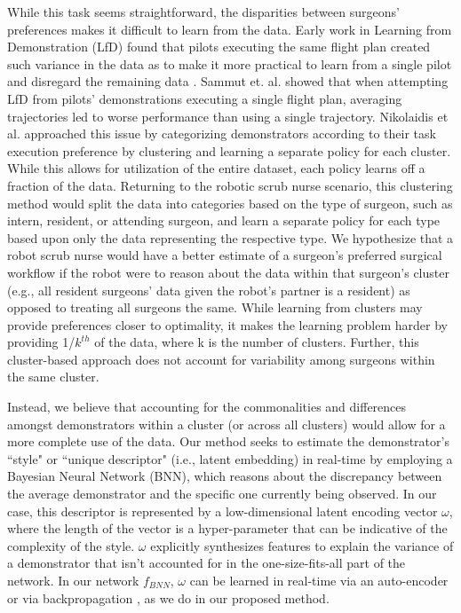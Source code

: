 \documentclass[conference]{IEEEtran}
\begin{document}
\par While this task seems straightforward, the disparities between surgeons' preferences makes it difficult to learn from the data. Early work in Learning from Demonstration (LfD) found that pilots executing the same flight plan created such variance in the data as to make it more practical to learn from a single pilot and disregard the remaining data \cite{DBLP:conf/icml/MoralesS04}. Sammut et. al. \cite{DBLP:conf/icml/SammutHKM92} showed that when attempting LfD from pilots' demonstrations executing a single flight plan, averaging trajectories led to worse performance than using a single trajectory. Nikolaidis et al. \cite{Nikolaidis:2015:EML:2696454.2696455} approached this issue by categorizing demonstrators according to their task execution preference by clustering and learning a separate policy for each cluster. While this allows for utilization of the entire dataset, each policy learns off a fraction of the data. Returning to the robotic scrub nurse scenario, this clustering method would split the data into categories based on the type of surgeon, such as intern, resident, or attending surgeon, and learn a separate policy for each type based upon only the data representing the respective type. We hypothesize that a robot scrub nurse would have a better estimate of a surgeon's preferred surgical workflow if the robot were to reason about the data within that surgeon's cluster (e.g., all resident surgeons' data given the robot's partner is a resident) as opposed to treating all surgeons the same.  While learning from clusters may provide preferences closer to optimality, it makes the learning problem harder by providing 1/$k^{th}$ of the data, where k is the number of clusters. Further, this cluster-based approach does not account for variability among surgeons within the same cluster. 

\par Instead, we believe that accounting for the commonalities and differences amongst demonstrators within a cluster (or across all clusters) would allow for a more complete use of the data. Our method seeks to estimate the demonstrator's ``style" or ``unique descriptor" (i.e., latent embedding) in real-time by employing a Bayesian Neural Network (BNN), which reasons about the discrepancy between the average demonstrator and the specific one currently being observed. In our case, this descriptor is represented by a low-dimensional latent encoding vector $\omega$, where the length of the vector is a hyper-parameter that can be indicative of the complexity of the style. $\omega$ explicitly synthesizes features to explain the variance of a demonstrator that isn't accounted for in the one-size-fits-all part of the network. In our network  $f_{BNN}$, $\omega$  can be learned in real-time via an auto-encoder \cite{HinSal06} or via backpropagation \cite{DBLP:conf/aaai/KillianKD17}, as we do in our proposed method.
\end{document}
